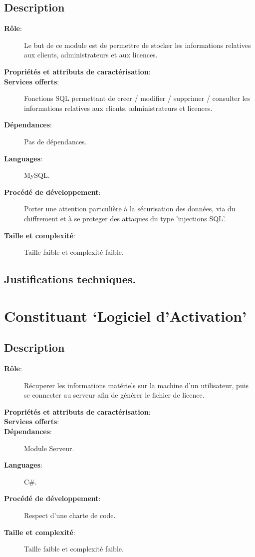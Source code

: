 \subsection{Description}
\begin{description}
	\item[\textbf{Rôle}:]
		Le but de ce module est de permettre de stocker les informations relatives aux
		clients, administrateurs et aux licences. 
	\item[\textbf{Propriétés et attributs de caractérisation}:]
	\item[\textbf{Services offerts}:]
		Fonctions SQL permettant de creer / modifier / supprimer / consulter les 
	  informations relatives aux clients, administrateurs et licences.
	\item[\textbf{Dépendances}:]
		Pas de dépendances.		
	\item[\textbf{Languages}:]
		MySQL.
	\item[\textbf{Procédé de développement}:]
	  Porter une attention partculière à la sécurisation des données, via
	  du chiffrement et à se proteger des attaques du type 'injections SQL'. 
	\item[\textbf{Taille et complexité}:]
		Taille faible et complexité faible. 
\end{description}
\subsection{Justifications techniques.}

\section{Constituant `Logiciel d'Activation'}
\subsection{Description}
\begin{description}
	\item[\textbf{Rôle}:]
		Récuperer les informations matériels sur la machine d'un utilisateur, puis 
		se connecter au serveur afin de générer le fichier de licence.
	\item[\textbf{Propriétés et attributs de caractérisation}:]
	\item[\textbf{Services offerts}:]
	\item[\textbf{Dépendances}:]
		Module Serveur.
	\item[\textbf{Languages}:]
		C\#.
	\item[\textbf{Procédé de développement}:]
		Respect d'une charte de code. 
	\item[\textbf{Taille et complexité}:]
		Taille faible et complexité faible. 
\end{description}

